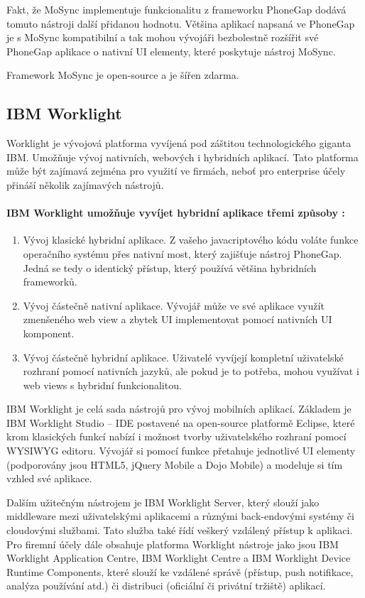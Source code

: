 Fakt, že MoSync implementuje funkcionalitu z frameworku PhoneGap dodává tomuto nástroji další přidanou hodnotu. Většina aplikací napsaná ve PhoneGap je s MoSync kompatibilní a tak mohou vývojáři bezbolestně rozšířit své PhoneGap aplikace o nativní UI elementy, které poskytuje nástroj MoSync.

Framework MoSync je open-source a je šířen zdarma.

\subsection{IBM Worklight}
Worklight je vývojová platforma vyvíjená pod záštitou technologického giganta IBM. Umožňuje vývoj nativních, webových i hybridních aplikací. Tato platforma může být zajímavá zejména pro využití ve firmách, neboť pro enterprise účely přináší několik zajímavých nástrojů.

\paragraph{IBM Worklight umožňuje vyvíjet hybridní aplikace třemi způsoby \cite{ibm_worklight_overview}:}
\begin{enumerate}
	\item Vývoj klasické hybridní aplikace. Z vašeho javacriptového kódu voláte funkce operačního systému přes nativní most, který zajišťuje nástroj PhoneGap. Jedná se tedy o identický přístup, který používá většina hybridních frameworků.
	\item Vývoj částečně nativní aplikace. Vývojář může ve své aplikace využít zmenšeného web view a zbytek UI implementovat pomocí nativních UI komponent.
	\item Vývoj částečně hybridní aplikace. Uživatelé vyvíjejí kompletní uživatelské rozhraní pomocí nativních jazyků, ale pokud je to potřeba, mohou využívat i web views s hybridní funkcionalitou.
\end{enumerate}

IBM Worklight je celá sada nástrojů pro vývoj mobilních aplikací. Základem je IBM Worklight Studio – IDE postavené na open-source platformě Eclipse, které krom klasických funkcí nabízí i možnost tvorby uživatelského rozhraní pomocí WYSIWYG editoru. Vývojář si pomocí funkce  přetahuje jednotlivé UI elementy (podporovány jsou HTML5, jQuery Mobile a Dojo Mobile) a modeluje si tím vzhled své aplikace.

Dalším užitečným nástrojem je IBM Worklight Server, který slouží jako middleware mezi uživatelskými aplikacemi a různými back-endovými systémy či cloudovými službami. Tato služba také řídí veškerý vzdálený přístup k aplikaci. Pro firemní účely dále obsahuje platforma Worklight nástroje jako jsou  IBM Worklight Application Centre, IBM Worklight Centre a IBM Worklight Device Runtime Components, které slouží ke vzdálené správě (přístup, push notifikace, analýza používání atd.) či distribuci (oficiální či privátní tržiště) aplikací.


